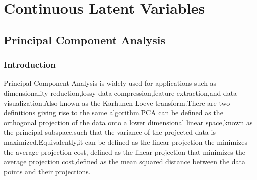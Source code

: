  \chapter{Continuous Latent Variables}
 \label{chap:Continuous Latent Variables}
 \section{Principal Component Analysis}
 \subsection{Introduction}
 Principal Component Analysis is widely used for applications such as dimensionality reduction,lossy data compression,feature extraction,and data visualization.Also known as the Karhunen-Loeve transform.There are two definitions giving rise to the same algorithm.PCA can be defined as the orthogonal projection of the data onto a lower dimensional linear space,known as the principal subspace,such that the variance of the projected data  is maximized.Equivalently,it can be defined as the linear projection the minimizes the average projection cost,
defined as  the linear projection that minimizes the average projection cost,defined as the mean squared distance between the data points and their projections.
